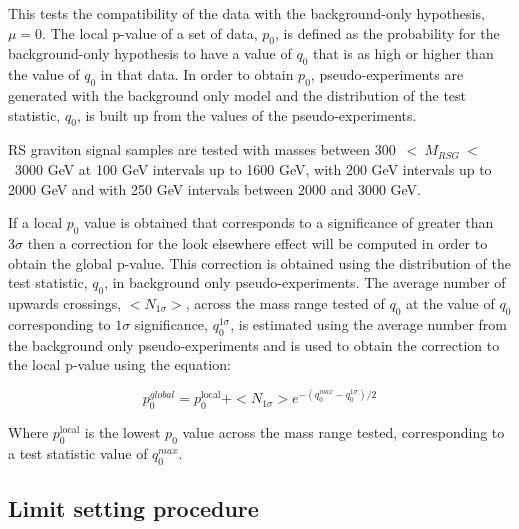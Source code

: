 This tests the compatibility of the data with the background-only hypothesis, $\mu = 0$. The local p-value of a set of data, $p_0$, is defined as the probability for the background-only hypothesis to have a value of $q_0$ that is as high or higher than the value of $q_{0}$ in that data. In order to obtain $p_0$, pseudo-experiments are generated with the background only model and the distribution of the test statistic, $q_{0}$, is built up from the values of the pseudo-experiments.

RS graviton signal samples are tested with masses between 300~$<~M_{RSG}~<$~3000 GeV at 100 GeV intervals up to 1600 GeV, with 200 GeV intervals up to 2000 GeV and with 250 GeV intervals between 2000 and 3000 GeV.

If a local $p_{0}$ value is obtained that corresponds to a significance of greater than $3\sigma$ then a correction for the look elsewhere effect will be computed in order to obtain the global p-value. This correction is obtained using the distribution of the test statistic, $q_{0}$, in background only pseudo-experiments. The average number of upwards crossings, $<N_{1\sigma}>$, across the mass range tested of $q_{0}$ at the value of $q_{0}$ corresponding to $1\sigma$ significance, $q_{0}^{1\sigma}$, is estimated using the average number from the background only pseudo-experiments and is used to obtain the correction to the local p-value using the equation:

\begin{equation}
  p_{0}^{global} = p_{0}^{\text{local}} + <N_{1\sigma}>e^{-(q_{0}^{max} - q_{0}^{1\sigma})/2}
\end{equation}

\noindent
Where $p_{0}^{\text{local}}$ is the lowest $p_{0}$ value across the mass range tested, 
corresponding to a test statistic value of $q_{0}^{max}$. 


\subsection{Limit setting procedure}

